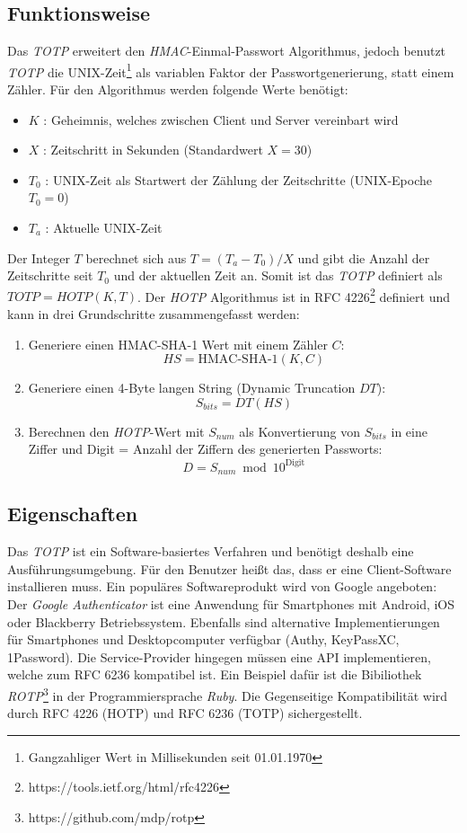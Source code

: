 \documentclass[11pt,a4paper,ngerman]{scrreprt}
\begin{document}
\subsection{Funktionsweise}
Das \textit{TOTP} erweitert den \textit{HMAC}-Einmal-Passwort Algorithmus, jedoch benutzt \textit{TOTP} die UNIX-Zeit\footnote{Gangzahliger Wert in Millisekunden seit 01.01.1970} als variablen Faktor der Passwortgenerierung, statt einem Zähler. Für den Algorithmus werden folgende Werte benötigt:
\begin{itemize}
    \item $K$ : Geheimnis, welches zwischen Client und Server vereinbart wird
    \item $X$ : Zeitschritt in Sekunden (Standardwert $X = 30$)
    \item $T_0$ : UNIX-Zeit als Startwert der Zählung der Zeitschritte (UNIX-Epoche $T_0 = 0$)
    \item $T_a$ : Aktuelle UNIX-Zeit
\end{itemize}
Der Integer $T$ berechnet sich aus $T = (T_a - T_0) / X$ und gibt die Anzahl der Zeitschritte seit $T_0$ und der aktuellen Zeit an. Somit ist das \textit{TOTP} definiert als $TOTP = HOTP(K, T)$. Der \textit{HOTP} Algorithmus ist in RFC 4226\footnote{https://tools.ietf.org/html/rfc4226} definiert und kann in drei Grundschritte zusammengefasst werden:
\begin{enumerate}
    \item Generiere einen HMAC-SHA-1 Wert mit einem Zähler $C$: 
    \[
        HS = \textrm{HMAC-SHA-1}(K, C)
    \]
    \item Generiere einen 4-Byte langen String (Dynamic Truncation $DT$): 
    \[
        S_{bits} = DT(HS)
    \]
    \item Berechnen den \textit{HOTP}-Wert mit $S_{num}$ als Konvertierung von $S_{bits}$ in eine Ziffer und Digit = Anzahl der Ziffern des generierten Passworts:
    \[
        D = S_{num} \bmod 10^{\textrm{Digit}}
    \]
\end{enumerate}
\subsection{Eigenschaften}
Das \textit{TOTP} ist ein Software-basiertes Verfahren und benötigt deshalb eine Ausführungsumgebung. Für den Benutzer heißt das, dass er eine Client-Software installieren muss. Ein populäres Softwareprodukt wird von Google angeboten: Der \textit{Google Authenticator} ist eine Anwendung für Smartphones mit Android, iOS oder Blackberry Betriebssystem. Ebenfalls sind alternative Implementierungen für Smartphones und Desktopcomputer verfügbar (Authy, KeyPassXC, 1Password). Die Service-Provider hingegen müssen eine API implementieren, welche zum RFC 6236 kompatibel ist. Ein Beispiel dafür ist die Bibiliothek \textit{ROTP}\footnote{https://github.com/mdp/rotp} in der Programmiersprache \textit{Ruby}. Die Gegenseitige Kompatibilität wird durch RFC 4226 (HOTP) und RFC 6236 (TOTP) sichergestellt.
\end{document}
